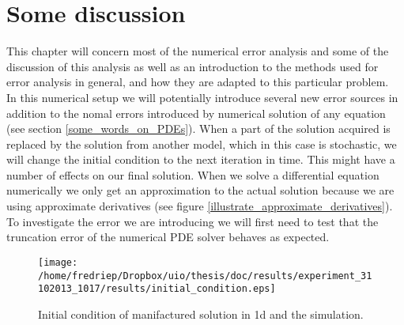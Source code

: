 \section{Some discussion}

This chapter will concern most of the numerical error analysis and some of the discussion of this analysis as well as an introduction to the methods used for error analysis in general, and how they are adapted to this particular problem.\\


In this numerical setup we will potentially introduce several new error sources in addition to the nomal errors introduced by numerical solution of any equation (see section \ref{some_words_on_PDEs}). 
When a part of the solution acquired is replaced by the solution from another model, which in this case is stochastic, we will change the initial condition to the next iteration in time. 
This might have a number of effects on our final solution. 
When we solve a differential equation numerically we only get an approximation to the actual solution because we are using approximate derivatives (see figure \ref{illustrate_approximate_derivatives}). 
To investigate the error we are introducing we will first need to test that the truncation error of the numerical PDE solver behaves as expected. 

\begin{figure}[H]
 \centering
 \texttt{[image: /home/fredriep/Dropbox/uio/thesis/doc/results/experiment\_31102013\_1017/results/initial\_condition.eps]}
 \caption[Initial condition in 1d]{Initial condition of manifactured solution in 1d and the simulation.}
 \label{initial_condition_1d}
\end{figure}


